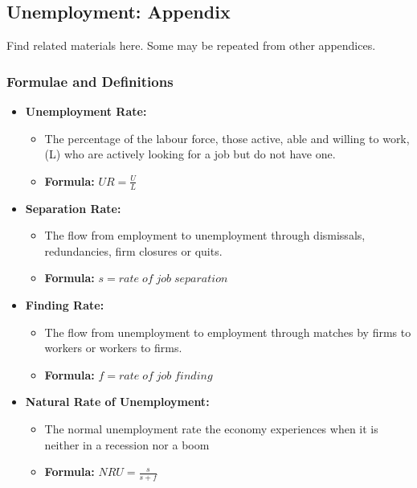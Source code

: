 \documentclass[12pt, letterpaper]{article}
\begin{document}
\subsection{Unemployment: Appendix}
Find related materials here. Some may be repeated from other appendices.
\subsubsection{Formulae and Definitions}
\begin{itemize}
	\item \textbf{Unemployment Rate:}
		\begin{itemize}
			\item The percentage of the labour force, those active, able and willing to work, (L) who are actively looking for a job but do not have one.
			\item \textbf{Formula:} $UR = \frac{U}{L}$
		\end{itemize}
	\item	\textbf{Separation Rate:}
		\begin{itemize}
			\item The flow from employment to unemployment through dismissals, redundancies, firm closures or quits.
			\item \textbf{Formula:} $s = rate\;of\;job\;separation$
		\end{itemize}
	\item	\textbf{Finding Rate:}
		\begin{itemize}
			\item The flow from unemployment to employment through matches by firms to workers or workers to firms.
			\item \textbf{Formula:} $f = rate\;of\;job\;finding$
		\end{itemize}
	\item \textbf{Natural Rate of Unemployment:}
		\begin{itemize}
			\item The normal unemployment rate the economy experiences when it is neither in a recession nor a boom
			\item \textbf{Formula:} $NRU = \frac{s}{s+f}$
		\end{itemize}	
\end{itemize}

\newpage
\end{document}
